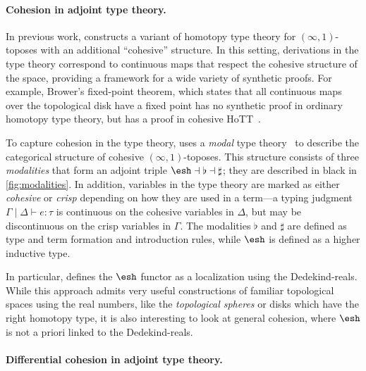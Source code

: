 \documentclass{article}
\begin{document}
\paragraph{Cohesion in adjoint type theory.}

In previous work, \citet{Shulman2015} constructs a variant of homotopy type
theory for $(\infty,1)$-toposes with an additional ``cohesive'' structure. In
this setting, derivations in the type theory correspond to continuous maps that
respect the cohesive structure of the space, providing a framework for a wide
variety of synthetic proofs. For example, Brower's fixed-point theorem, which
states that all continuous maps over the topological disk have a fixed point has
no synthetic proof in ordinary homotopy type theory, but has a proof in cohesive
HoTT~\citep{Shulman2015}.


To capture cohesion in the type theory, \citet{Shulman2015} uses a \emph{modal}
type theory~\citep{Pfenning2001} to describe the categorical structure of
cohesive $(\infty,1)$-toposes. This structure consists of three
\emph{modalities}  that form an adjoint triple
$\shape \dashv \flat \dashv \sharp$; they are described in black in
\cref{fig:modalities}. In addition, variables in the type theory are marked as
either \emph{cohesive} or \emph{crisp} depending on how they are used in a
term---a typing judgment $\Gamma \mid \Delta \vdash e : \tau$ is continuous on
the cohesive variables in $\Delta$, but may be discontinuous on the crisp
variables in $\Gamma$. The modalities $\flat$ and $\sharp$ are defined as type
and term formation and introduction rules, while $\shape$ is defined as a higher
inductive type.


In particular, \citeauthor{Shulman2015} defines the $\shape$ functor as a
localization using the Dedekind-reals. While this approach admits very
useful constructions of familiar topological spaces using the real numbers, like
the \emph{topological spheres} or disks which have the right homotopy type, it
is also interesting to look at general cohesion, where $\shape$ is not a priori
linked to the Dedekind-reals.


\paragraph{Differential cohesion in adjoint type theory.}
\end{document}

